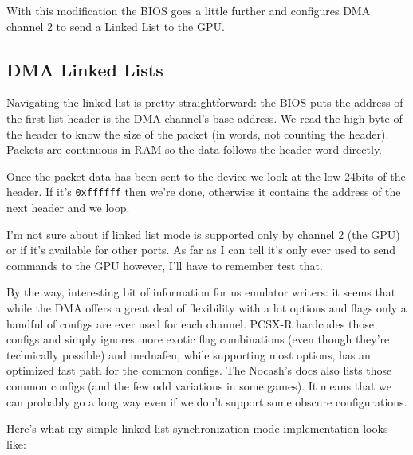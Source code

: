 \documentclass[a4paper]{article}
\newcommand{\code}[1] {\texttt{#1}}
\begin{document}
With this modification the BIOS goes a little further and configures
DMA channel 2 to send a Linked List to the GPU.

\subsection{DMA Linked Lists}

Navigating the linked list is pretty straightforward: the BIOS puts
the address of the first list header is the DMA channel's base
address. We read the high byte of the header to know the size of the
packet (in words, not counting the header). Packets are continuous in
RAM so the data follows the header word directly.

Once the packet data has been sent to the device we look at the low
24bits of the header. If it's \code{0xffffff} then we're done,
otherwise it contains the address of the next header and we loop.

I'm not sure about if linked list mode is supported only by channel 2
(the GPU) or if it's available for other ports. As far as I can tell
it's only ever used to send commands to the GPU however, I'll have to
remember test that.

By the way, interesting bit of information for us emulator writers: it
seems that while the DMA offers a great deal of flexibility with a lot
options and flags only a handful of configs are ever used for each
channel. PCSX-R hardcodes those configs and simply ignores more exotic
flag combinations (even though they're technically possible) and
mednafen, while supporting most options, has an optimized fast path
for the common configs. The Nocash's docs also lists those common
configs (and the few odd variations in some games). It means that we
can probably go a long way even if we don't support some obscure
configurations.

Here's what my simple linked list synchronization mode implementation
looks like:
\end{document}

